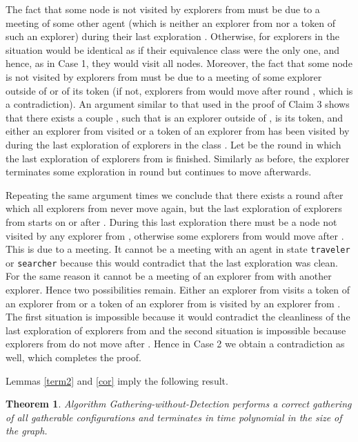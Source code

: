 \documentclass[11pt]{article}
\newtheorem{theorem}{Theorem}[section]
\newcommand{\qed}{\hfill  \bigbreak}
\newenvironment{proof}{\noindent {\bf Proof.}}{\qed}
\begin{document}
\begin{proof}
The fact that some node is not visited by explorers from  must be due to a meeting of some other agent
(which is neither an explorer from   nor a token of such an explorer) during their last exploration .
Otherwise, for explorers in  the situation would be identical as if their equivalence class were the only one, and hence, as in Case 1, 
they would visit all nodes. Moreover, the fact that some node is not visited by explorers from  must be due to a meeting of some explorer outside of 
or of its token (if not, explorers from  would move after round , which is a contradiction). 
An argument similar to that used in the proof of {Claim 3} shows that there exists a couple , such that  is an explorer outside of  ,
 is its token, and 
either an explorer from  visited  or a token of an explorer
from  has been visited by  during the last exploration of explorers in the class .
Let  be the round in which the last exploration of explorers from  is finished.
Similarly as before, the explorer  terminates some exploration in round  but continues to move afterwards.

Repeating the same argument  times we conclude that there exists a round 
after which all explorers from  never move again, but the last exploration of explorers from 
  starts on or after . During this last exploration there must be a node not visited by any explorer from , 
 otherwise some explorers from  would move after .
 This is due to a meeting. It cannot be a meeting with an agent in state {\tt traveler} or {\tt searcher} because this would contradict that the last exploration
was clean. For the same reason it cannot be a meeting of an explorer from  with another explorer. Hence two possibilities remain.
Either an explorer from  visits a token of an explorer from  or a token of an explorer from  is visited
by an explorer from . The first situation is impossible because it would contradict the cleanliness of the last exploration
of explorers from  and the second situation is impossible because explorers from  do not move after .
Hence in Case 2 we obtain a contradiction as well, which completes the proof.
    \end{proof}
    
    Lemmas \ref{term2} and \ref{cor} imply the following result.


\begin{theorem}
Algorithm Gathering-without-Detection performs a correct gathering of all gatherable configurations and terminates in time polynomial in the size of the graph.
\end{theorem}
\end{document}
